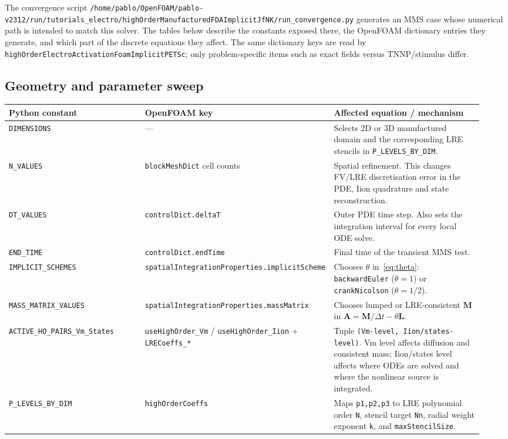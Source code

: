 \documentclass[11pt,a4paper]{article}
\newcommand{\code}[1]{\texttt{\small #1}}
\newcommand{\Mmass}{\mathbf{M}}
\newcommand{\Lop}{\mathbf{L}}
\newcommand{\Aimp}{\mathbf{A}}
\begin{document}
The convergence script
\code{/home/pablo/OpenFOAM/pablo-v2312/run/tutorials\_electro/highOrderManufacturedFDAImplicitJfNK/run\_convergence.py}
generates an MMS case whose numerical path is intended to match this
solver. The tables below describe the constants exposed there, the
OpenFOAM dictionary entries they generate, and which part of the
discrete equations they affect. The same dictionary keys are read by
\code{highOrderElectroActivationFoamImplicitPETSc}; only problem-specific
items such as exact fields versus TNNP/stimulus differ.

\subsection{Geometry and parameter sweep}
\begin{longtable}{@{}p{0.30\linewidth}p{0.28\linewidth}p{0.36\linewidth}@{}}
\toprule
Python constant & OpenFOAM key & Affected equation / mechanism \\
\midrule \endhead
\code{DIMENSIONS} & --- &
   Selects 2D or 3D manufactured domain and the corresponding LRE
   stencils in \code{P\_LEVELS\_BY\_DIM}. \\
\code{N\_VALUES} & \code{blockMeshDict} cell counts &
   Spatial refinement. This changes FV/LRE discretisation error in the
   PDE, Iion quadrature and state reconstruction. \\
\code{DT\_VALUES} & \code{controlDict.deltaT} &
   Outer PDE time step. Also sets the integration interval for every
   local ODE solve. \\
\code{END\_TIME} & \code{controlDict.endTime} &
   Final time of the transient MMS test. \\
\code{IMPLICIT\_SCHEMES} &
   \code{spatialIntegrationProperties.implicitScheme} &
   Chooses $\theta$ in~\eqref{eq:theta}: \code{backwardEuler}
   ($\theta=1$) or \code{crankNicolson} ($\theta=1/2$). \\
\code{MASS\_MATRIX\_VALUES} &
   \code{spatialIntegrationProperties.massMatrix} &
   Chooses lumped or LRE-consistent $\Mmass$ in
   $\Aimp=\Mmass/\Delta t-\theta\Lop$. \\
\code{ACTIVE\_HO\_PAIRS\_Vm\_States} &
   \code{useHighOrder\_Vm} / \code{useHighOrder\_Iion}
   + \code{LRECoeffs\_*} &
   Tuple \code{(Vm-level, Iion/states-level)}. Vm level affects
   diffusion and consistent mass; Iion/states level affects where ODEs
   are solved and where the nonlinear source is integrated. \\
\code{P\_LEVELS\_BY\_DIM} & \code{highOrderCoeffs} &
   Maps \code{p1,p2,p3} to LRE polynomial order \code{N}, stencil
   target \code{Nn}, radial weight exponent \code{k}, and
   \code{maxStencilSize}. \\
\bottomrule
\end{longtable}
\end{document}
